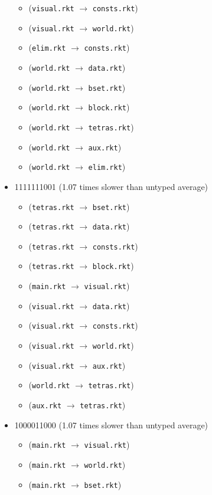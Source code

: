 \documentclass{article}
\newcommand{\mono}[1]{\texttt{#1}}
\begin{document}
\begin{itemize}
\begin{itemize}
  \item (\mono{visual.rkt} $\rightarrow$ \mono{consts.rkt})
  \item (\mono{visual.rkt} $\rightarrow$ \mono{world.rkt})
  \item (\mono{elim.rkt} $\rightarrow$ \mono{consts.rkt})
  \item (\mono{world.rkt} $\rightarrow$ \mono{data.rkt})
  \item (\mono{world.rkt} $\rightarrow$ \mono{bset.rkt})
  \item (\mono{world.rkt} $\rightarrow$ \mono{block.rkt})
  \item (\mono{world.rkt} $\rightarrow$ \mono{tetras.rkt})
  \item (\mono{world.rkt} $\rightarrow$ \mono{aux.rkt})
  \item (\mono{world.rkt} $\rightarrow$ \mono{elim.rkt})
  \end{itemize}
\item 1111111001 (1.07 times slower than untyped average)
  \begin{itemize}
  \item (\mono{tetras.rkt} $\rightarrow$ \mono{bset.rkt})
  \item (\mono{tetras.rkt} $\rightarrow$ \mono{data.rkt})
  \item (\mono{tetras.rkt} $\rightarrow$ \mono{consts.rkt})
  \item (\mono{tetras.rkt} $\rightarrow$ \mono{block.rkt})
  \item (\mono{main.rkt} $\rightarrow$ \mono{visual.rkt})
  \item (\mono{visual.rkt} $\rightarrow$ \mono{data.rkt})
  \item (\mono{visual.rkt} $\rightarrow$ \mono{consts.rkt})
  \item (\mono{visual.rkt} $\rightarrow$ \mono{world.rkt})
  \item (\mono{visual.rkt} $\rightarrow$ \mono{aux.rkt})
  \item (\mono{world.rkt} $\rightarrow$ \mono{tetras.rkt})
  \item (\mono{aux.rkt} $\rightarrow$ \mono{tetras.rkt})
  \end{itemize}
\item 1000011000 (1.07 times slower than untyped average)
  \begin{itemize}
  \item (\mono{main.rkt} $\rightarrow$ \mono{visual.rkt})
  \item (\mono{main.rkt} $\rightarrow$ \mono{world.rkt})
  \item (\mono{main.rkt} $\rightarrow$ \mono{bset.rkt})

\end{itemize}
\end{itemize}
\end{document}
